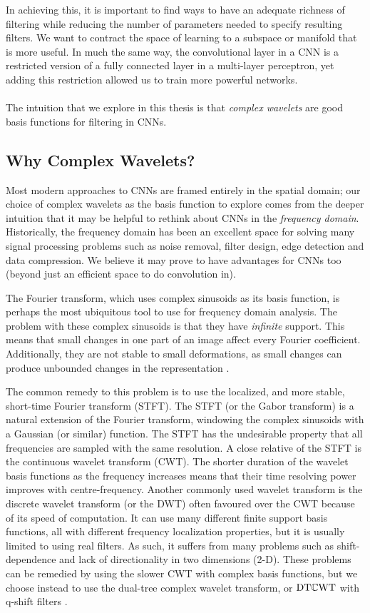 In achieving this, it is important to find ways to have an adequate
richness of filtering while reducing the number of parameters needed to specify resulting
filters. We want to contract the space of learning to a subspace or manifold that
is more useful. In much the same way, the convolutional layer in a CNN is a restricted
version of a fully connected layer in a multi-layer perceptron, yet adding this
restriction allowed us to train more powerful networks.
\\\\
The intuition that we explore in this thesis is that \emph{complex wavelets} are
good basis functions for filtering in CNNs.

\subsection{Why Complex Wavelets?}
Most modern approaches to CNNs are framed entirely in the spatial domain; our
choice of complex wavelets as the basis function to explore comes from the
deeper intuition that it may be helpful to rethink about CNNs in the
\emph{frequency domain}.  Historically, the frequency domain has been an
excellent space for solving many signal processing problems such as noise
removal, filter design, edge detection and data compression. We believe it may prove to
have advantages for CNNs too (beyond just an efficient space to do convolution
in).

The Fourier transform, which uses complex sinusoids as
its basis function, is perhaps the most ubiquitous tool to use for frequency
domain analysis. The problem with these complex sinusoids is that they have
\emph{infinite} support. This means that small changes in one part of an image
affect every Fourier coefficient. Additionally, they are not stable to small
deformations, as small changes can produce unbounded changes in the representation
\cite{mallat_group_2012}.

The common remedy to this problem is to use the localized, and more
stable, short-time Fourier transform (STFT). The STFT (or the Gabor transform)
is a natural extension of the Fourier transform, windowing the complex sinusoids
with a Gaussian (or similar) function. The STFT has the undesirable property that all
frequencies are sampled with the same resolution. A close relative of the STFT is the
continuous wavelet transform (CWT). The shorter duration of the wavelet basis
functions as the frequency increases means that their time resolving power
improves with centre-frequency.
Another commonly used
wavelet transform is the discrete wavelet transform (or the DWT) often favoured over
the CWT because of its speed of computation. It can use many
different finite support basis functions, all with different frequency
localization properties, but it is usually limited to using real filters. As such, it
suffers from many problems such as shift-dependence and lack of directionality in
two dimensions (2-D). These problems can be remedied by using the slower CWT with complex basis
functions, but we choose instead to use the dual-tree complex wavelet transform,
or $\mathrm{DT}\mathbb{C}\mathrm{WT}$ \cite{selesnick_dual-tree_2005} with q-shift filters \cite{kingsbury_complex_2001}.

